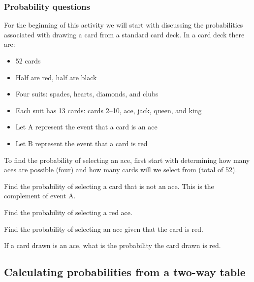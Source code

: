 \documentclass[
]{report}
\begin{document}
\subsubsection*{Probability questions}\label{probability-questions}

For the beginning of this activity we will start with discussing the probabilities associated with drawing a card from a standard card deck. In a card deck there are:

\begin{itemize}
\item
  52 cards
\item
  Half are red, half are black
\item
  Four suits: spades, hearts, diamonds, and clubs
\item
  Each suit has 13 cards: cards 2--10, ace, jack, queen, and king
\item
  Let A represent the event that a card is an ace
\item
  Let B represent the event that a card is red
\end{itemize}

To find the probability of selecting an ace, first start with determining how many aces are possible (four) and how many cards will we select from (total of 52).

\vspace{1in}

Find the probability of selecting a card that is not an ace. This is the complement of event A.

\vspace{1in}

Find the probability of selecting a red ace.

\vspace{1in}

Find the probability of selecting an ace given that the card is red.

\vspace{1in}

If a card drawn is an ace, what is the probability the card drawn is red.

\vspace{1in}

\subsection*{Calculating probabilities from a two-way table}\label{calculating-probabilities-from-a-two-way-table}
\end{document}
